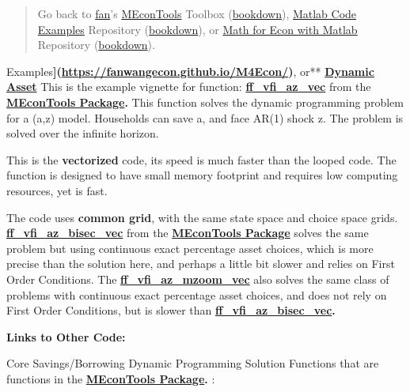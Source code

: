 \documentclass[
]{book}
\begin{document}
\begin{quote}
Go back to \href{http://fanwangecon.github.io/}{fan}'s \href{https://fanwangecon.github.io/MEconTools/}{MEconTools} Toolbox (\href{https://fanwangecon.github.io/MEconTools/bookdown}{bookdown}), \href{https://fanwangecon.github.io/M4Econ/}{Matlab Code Examples} Repository (\href{https://fanwangecon.github.io/M4Econ/bookdown}{bookdown}), or \href{https://fanwangecon.github.io/Math4Econ/}{Math for Econ with Matlab} Repository (\href{https://fanwangecon.github.io/Math4Econ/bookdown}{bookdown}).
\end{quote}

Examples\textbf{{]}(\url{https://fanwangecon.github.io/M4Econ/})}, or** \href{https://fanwangecon.github.io/CodeDynaAsset/}{\textbf{Dynamic
Asset}}
This is the example vignette for function:
\href{https://github.com/FanWangEcon/MEconTools/blob/master/MEconTools/vfi/ff_vfi_az_vec.m}{\textbf{ff\_vfi\_az\_vec}}
from the \href{https://fanwangecon.github.io/MEconTools/}{\textbf{MEconTools
Package}}\textbf{.} This function
solves the dynamic programming problem for a (a,z) model. Households can
save a, and face AR(1) shock z. The problem is solved over the infinite
horizon.

This is the \textbf{vectorized} code, its speed is much faster than the
looped code. The function is designed to have small memory footprint and
requires low computing resources, yet is fast.

The code uses \textbf{common grid}, with the same state space and choice
space grids.
\href{https://github.com/FanWangEcon/MEconTools/blob/master/MEconTools/vfi/ff_vfi_az_bisec_vec.m}{\textbf{ff\_vfi\_az\_bisec\_vec}}
from the \href{https://fanwangecon.github.io/MEconTools/}{\textbf{MEconTools
Package}} solves the same
problem but using continuous exact percentage asset choices, which is
more precise than the solution here, and perhaps a little bit slower and
relies on First Order Conditions. The
\href{https://github.com/FanWangEcon/MEconTools/blob/master/MEconTools/vfi/ff_vfi_az_mzoom_vec.m}{\textbf{ff\_vfi\_az\_mzoom\_vec}}
also solves the same class of problems with continuous exact percentage
asset choices, and does not rely on First Order Conditions, but is
slower than
\href{https://github.com/FanWangEcon/MEconTools/blob/master/MEconTools/vfi/ff_vfi_az_bisec_vec.m}{\textbf{ff\_vfi\_az\_bisec\_vec}}\textbf{.}

\textbf{Links to Other Code:}

Core Savings/Borrowing Dynamic Programming Solution Functions that are
functions in the \href{https://fanwangecon.github.io/MEconTools/}{\textbf{MEconTools
Package}}\textbf{.} :
\end{document}
